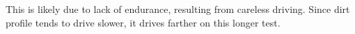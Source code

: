 This is likely due to lack of endurance, resulting from careless driving. Since dirt profile tends to drive slower, it drives farther on this longer test.





